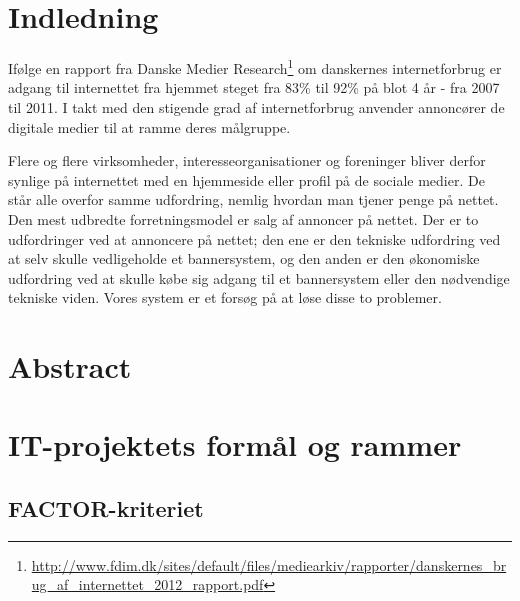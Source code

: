 \documentclass[a4paper,12pt]{article}
\begin{document}
\section{Indledning}

Ifølge en rapport fra Danske Medier Research\footnote{\url{ http://www.fdim.dk/sites/default/files/mediearkiv/rapporter/danskernes\_brug\_af\_internettet\_2012\_rapport.pdf}} om danskernes internetforbrug er adgang til internettet fra hjemmet steget fra 83\% til 92\% på blot 4 år - fra 2007 til 2011. I takt med den stigende grad af internetforbrug anvender annoncører de digitale medier til at ramme deres målgruppe.

Flere og flere virksomheder, interesseorganisationer og foreninger bliver derfor synlige på internettet med en hjemmeside eller profil på de sociale medier. De står alle overfor samme udfordring, nemlig hvordan man tjener penge på nettet. Den mest udbredte forretningsmodel er salg af annoncer på nettet. Der er to udfordringer ved at annoncere på nettet; den ene er den tekniske udfordring ved at selv skulle vedligeholde et bannersystem, og den anden er den økonomiske udfordring ved at skulle købe sig adgang til et bannersystem eller den nødvendige tekniske viden. Vores system er et forsøg på at løse disse to problemer.

\section{Abstract}


\section{IT-projektets formål og rammer}


\subsection{FACTOR-kriteriet}
\end{document}
